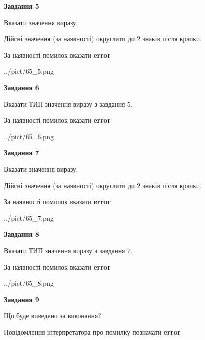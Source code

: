 \documentclass[11pt, ukrainian]{article}
\begin{document}
{\begin {large}
{\begin {center}\textbf{Завдання 5}\end {center}}\par
Вказати значення виразу. \par
Дійсні значення (за наявності) округлити до 2 знаків після крапки. \par
За наявності помилок вказати \textbf{error}

\begin{center}
	{../pict/65_5.png}
\end{center}
\newpage

{\begin {center}\textbf{Завдання 6}\end {center}}\par
Вказати ТИП значення виразу з завдання 5. \par
За наявності помилок вказати \textbf{error}

\begin{center}
	{../pict/65_6.png}
\end{center}
\newpage

{\begin {center}\textbf{Завдання 7}\end {center}}\par
Вказати значення виразу. \par
Дійсні значення (за наявності) округлити до 2 знаків після крапки. \par
За наявності помилок вказати \textbf{error}

\begin{center}
	{../pict/65_7.png}
\end{center}
\newpage

{\begin {center}\textbf{Завдання 8}\end {center}}\par
Вказати ТИП значення виразу з завдання 7. \par
За наявності помилок вказати \textbf{error}

\begin{center}
	{../pict/65_8.png}
\end{center}
\newpage

{\begin {center}\textbf{Завдання 9}\end {center}}\par
Що буде виведено за виконання? \par
Повідомлення інтерпретатора про помилку позначати \textbf{error}


\end{large}}
\end{document}
